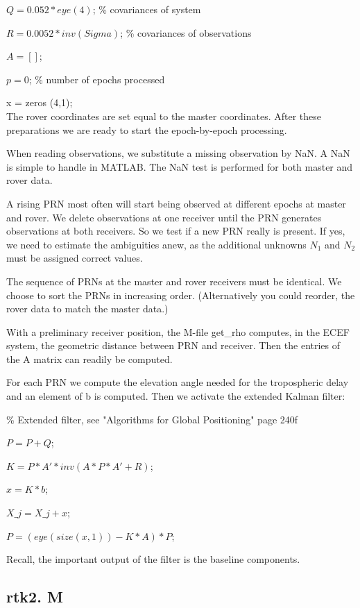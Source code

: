 $Q = 0.05\hat{} 2 * eye (4)$;               \% covariances of system

$R = 0.005\hat{} 2 * inv(Sigma)$;           \% covariances of observations

$A = []$;

$p = 0$;                             \% number of epochs processed

x = zeros (4,1);\\
The rover coordinates are set equal to the master coordinates. After these preparations we
are ready to start the epoch-by-epoch processing.

When reading observations, we substitute a missing observation by NaN. A NaN is simple to handle in MATLAB. The NaN test is performed for both master and rover data.

A rising PRN most often will start being observed at different epochs at master and
rover. We delete observations at one receiver until the PRN generates observations at both receivers. So we test if a new PRN really is present. If yes, we need to estimate the
ambiguities anew, as the additional unknowns $N_{1}$ and $N_{2}$ must be assigned correct values.

The sequence of PRNs at the master and rover receivers must be identical. We choose
to sort the PRNs in increasing order. (Alternatively you could reorder, the rover data to
match the master data.)

With a preliminary receiver position, the M-file get\_rho computes, in the ECEF system, the geometric distance between PRN and receiver. Then the entries of the A matrix can readily be computed.

For each PRN we compute the elevation angle needed for the tropospheric delay and an element of b is computed. Then we activate the extended Kalman filter:

\% Extended filter, see "Algorithms for Global Positioning" page 240f

$P = P+Q$;

$K = P*A' * inv(A*P*A'+R)$;

$x = K*b$;

$X\_j = X\_j + x$;

$P = (eye(size(x,1)) - K*A)*P$;

Recall, the important output of the filter is the baseline components.

\subsection{rtk2. M}

